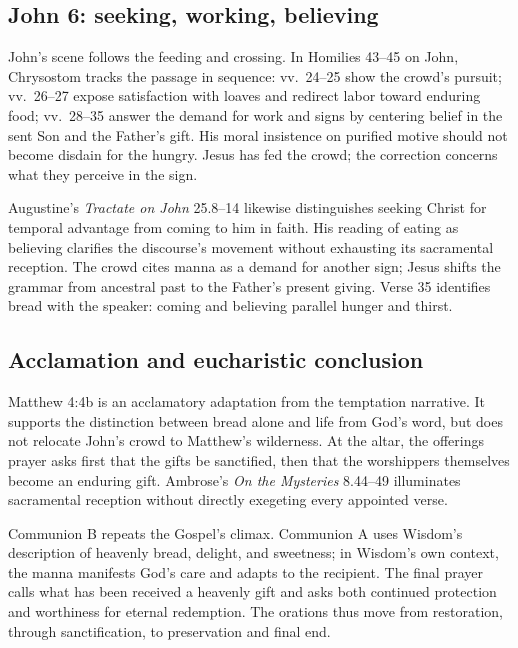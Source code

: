 \subsection*{John 6: seeking, working, believing}

John's scene follows the feeding and crossing. In Homilies 43--45 on John,
Chrysostom tracks the passage in sequence: vv.~24--25 show the crowd's pursuit;
vv.~26--27 expose satisfaction with loaves and redirect labor toward enduring
food; vv.~28--35 answer the demand for work and signs by centering belief in
the sent Son and the Father's gift. His moral insistence on purified motive
should not become disdain for the hungry. Jesus has fed the crowd; the
correction concerns what they perceive in the sign.

Augustine's \emph{Tractate on John} 25.8--14 likewise distinguishes seeking
Christ for temporal advantage from coming to him in faith. His reading of
eating as believing clarifies the discourse's movement without exhausting its
sacramental reception. The crowd cites manna as a demand for another sign;
Jesus shifts the grammar from ancestral past to the Father's present giving.
Verse 35 identifies bread with the speaker: coming and believing parallel
hunger and thirst.

\subsection*{Acclamation and eucharistic conclusion}

Matthew 4:4b is an acclamatory adaptation from the temptation narrative. It
supports the distinction between bread alone and life from God's word, but
does not relocate John's crowd to Matthew's wilderness. At the altar, the
offerings prayer asks first that the gifts be sanctified, then that the
worshippers themselves become an enduring gift. Ambrose's \emph{On the
Mysteries} 8.44--49 illuminates sacramental reception without directly
exegeting every appointed verse.

Communion B repeats the Gospel's climax. Communion A uses Wisdom's description
of heavenly bread, delight, and sweetness; in Wisdom's own context, the manna
manifests God's care and adapts to the recipient. The final prayer calls what
has been received a heavenly gift and asks both continued protection and
worthiness for eternal redemption. The orations thus move from restoration,
through sanctification, to preservation and final end.
